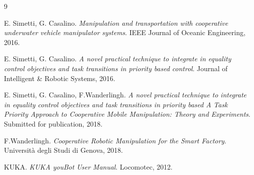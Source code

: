 \documentclass[a4paper, 12pt, notitlepage]{article}
\begin{document}
\begin{multicols}{2}
		
		\renewcommand\refname{\large{Reference}}
		\begin{thebibliography} {9}
			\vspace{-7px}
			\small
			
			E. Simetti, G. Casalino. 
			\textit{Manipulation and transportation with cooperative underwater vehicle manipulator systems}.
			IEEE Journal of Oceanic Engineering, 2016.	
			
			E. Simetti, G. Casalino. 
			\textit{A novel practical technique to integrate in equality control objectives and task transitions in priority based control}.
			Journal of Intelligent \& Robotic Systems, 2016.
			
			E. Simetti, G. Casalino, F.Wanderlingh. 
			\textit{A novel practical technique to integrate in equality control objectives and task transitions in priority based A Task Priority Approach to Cooperative Mobile Manipulation: Theory and Experiments}.
			Submitted for publication, 2018.	
			
			F.Wanderlingh. 
			\textit{Cooperative Robotic Manipulation for the Smart Factory}.
			Università degli Studi di Genova, 2018.
			
			KUKA. 
			\textit{KUKA youBot User Manual}.
			Locomotec, 2012.
			
		\end{thebibliography}


	\end{multicols}	
\end{document}
